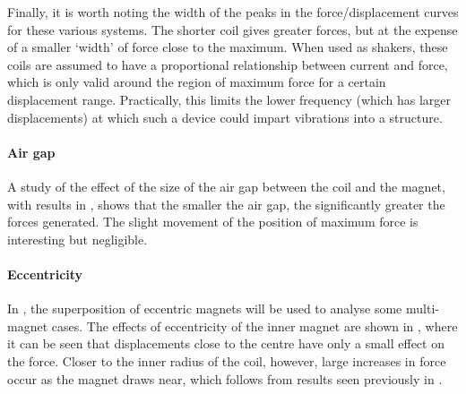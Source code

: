 Finally, it is worth noting the width of the peaks in the
force/displacement curves for these various systems. The shorter coil
gives greater forces, but at the expense of a smaller `width' of force
close to the maximum. When used as shakers, these coils are assumed to
have a proportional relationship between current and force, which is only valid
around the region of maximum force for a certain displacement range. 
Practically, this limits the lower frequency (which has larger displacements) 
at which such a device could impart vibrations into a structure.

\paragraph{Air gap}

A study of the effect of the size of the air gap between the coil and the
magnet, with results in , shows that the smaller the air
gap, the significantly greater the forces generated. The slight movement of
the position of maximum force is interesting but negligible.

\begin{figure}
  \begin{subfigure}
  \end{subfigure}\par
  \begin{subfigure}
  \end{subfigure}
\end{figure}

\paragraph{Eccentricity}

In , the superposition of eccentric magnets will be used to
analyse some multi-magnet cases. The effects of eccentricity of the inner
magnet are shown in , where it can be seen that
displacements close to the centre have only a small effect on the force.
Closer to the inner radius of the coil, however, large increases in force
occur as the magnet draws near, which follows from results seen previously in
.


